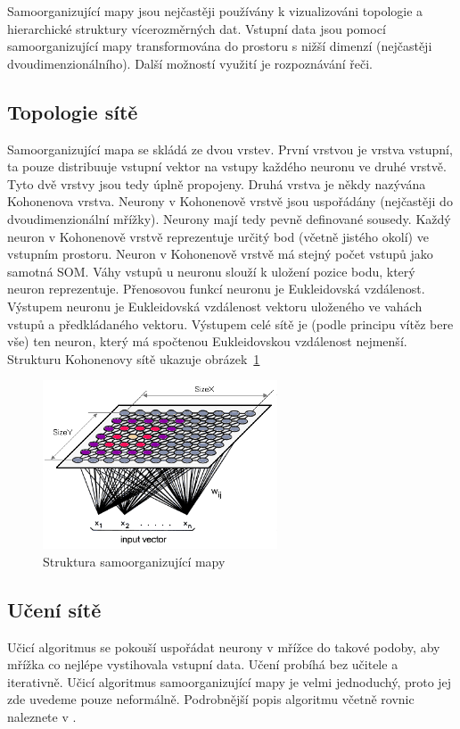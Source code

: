 \documentclass[11pt,twoside,a4paper]{book}
\begin{document}
Samoorganizující mapy jsou nejčastěji používány k vizualizováni topologie a hierarchické struktury vícerozměrných dat. Vstupní data jsou pomocí samoorganizující mapy transformována do prostoru s nižší dimenzí (nejčastěji dvoudimenzionálního). Další možností využití je rozpoznávání řeči.\cite{skripta} 
\subsection{Topologie sítě}
Samoorganizující mapa se skládá ze dvou vrstev. První vrstvou je vrstva vstupní, ta pouze distribuuje vstupní vektor na vstupy každého neuronu ve druhé vrstvě. Tyto dvě vrstvy jsou tedy úplně propojeny. Druhá vrstva je někdy nazývána Kohonenova vrstva. Neurony v Kohonenově vrstvě jsou uspořádány (nejčastěji do dvoudimenzionální mřížky). Neurony mají tedy pevně definované sousedy. Každý neuron v Kohonenově vrstvě reprezentuje určitý bod (včetně jistého okolí) ve vstupním prostoru. Neuron v Kohonenově vrstvě má stejný počet vstupů jako samotná SOM. Váhy vstupů u neuronu slouží k uložení pozice bodu, který neuron reprezentuje. Přenosovou funkcí neuronu je Eukleidovská vzdálenost. Výstupem neuronu je Eukleidovská vzdálenost vektoru uloženého ve vahách vstupů a předkládaného vektoru. Výstupem celé sítě  je (podle principu vítěz bere vše) ten neuron, který má spočtenou Eukleidovskou vzdálenost nejmenší.
Strukturu Kohonenovy sítě ukazuje obrázek~\ref{fig:kohonen1}

\begin{figure}[!h]
\begin{center}
\includegraphics[height=5cm]{figures/kohonen1.png}
\caption{Struktura samoorganizující mapy\cite{SDL}}
\label{fig:kohonen1}
\end{center}
\end{figure}
\subsection{Učení sítě}
Učicí algoritmus se pokouší uspořádat neurony v mřížce do takové podoby, aby mřížka co nejlépe vystihovala vstupní data. Učení probíhá bez učitele a iterativně. Učicí algoritmus samoorganizující mapy je velmi jednoduchý, proto jej zde uvedeme pouze neformálně. Podrobnější popis algoritmu včetně rovnic naleznete v \cite{skripta}.
\end{document}
